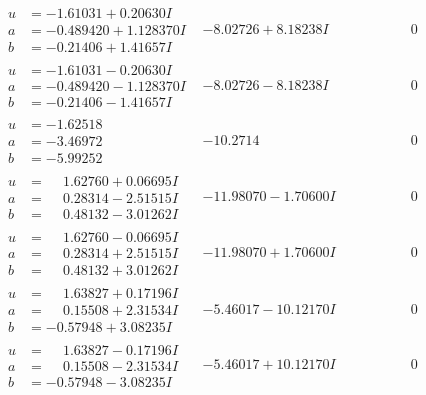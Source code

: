 \documentclass[1p]{elsarticle_modified}
\theoremstyle{definition}
\begin{document}
$$\begin{array}{c|c|c}
\begin{aligned}
u &= -1.61031 + 0.20630 I \\
a &= -0.489420 + 1.128370 I \\
b &= -0.21406 + 1.41657 I\end{aligned}
 & -8.02726 + 8.18238 I & \phantom{-0.000000 } 0 \\ \hline\begin{aligned}
u &= -1.61031 - 0.20630 I \\
a &= -0.489420 - 1.128370 I \\
b &= -0.21406 - 1.41657 I\end{aligned}
 & -8.02726 - 8.18238 I & \phantom{-0.000000 } 0 \\ \hline\begin{aligned}
u &= -1.62518\phantom{ +0.000000I} \\
a &= -3.46972\phantom{ +0.000000I} \\
b &= -5.99252\phantom{ +0.000000I}\end{aligned}
 & -10.2714\phantom{ +0.000000I} & \phantom{-0.000000 } 0 \\ \hline\begin{aligned}
u &= \phantom{-}1.62760 + 0.06695 I \\
a &= \phantom{-}0.28314 - 2.51515 I \\
b &= \phantom{-}0.48132 - 3.01262 I\end{aligned}
 & -11.98070 - 1.70600 I & \phantom{-0.000000 } 0 \\ \hline\begin{aligned}
u &= \phantom{-}1.62760 - 0.06695 I \\
a &= \phantom{-}0.28314 + 2.51515 I \\
b &= \phantom{-}0.48132 + 3.01262 I\end{aligned}
 & -11.98070 + 1.70600 I & \phantom{-0.000000 } 0 \\ \hline\begin{aligned}
u &= \phantom{-}1.63827 + 0.17196 I \\
a &= \phantom{-}0.15508 + 2.31534 I \\
b &= -0.57948 + 3.08235 I\end{aligned}
 & -5.46017 - 10.12170 I & \phantom{-0.000000 } 0 \\ \hline\begin{aligned}
u &= \phantom{-}1.63827 - 0.17196 I \\
a &= \phantom{-}0.15508 - 2.31534 I \\
b &= -0.57948 - 3.08235 I\end{aligned}
 & -5.46017 + 10.12170 I & \phantom{-0.000000 } 0 \\ \hline\begin{aligned}

\end{aligned}
\end{array}$$
\end{document}
